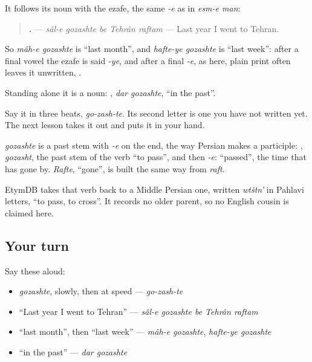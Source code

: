 It follows its noun with the ezafe, the same \emph{-e} as in \emph{esm-e man}:

\begin{quote}
\textbf{    .} — \emph{sâl-e gozashte be Tehrân raftam} — Last year I went to Tehran.
\end{quote}

So \emph{mâh-e gozashte} is \textquotedblleft{}last month\textquotedblright{}, and \emph{hafte-ye gozashte} is \textquotedblleft{}last week\textquotedblright{}: after a final vowel the ezafe is said \emph{-ye}, and after a final \emph{-e}, as here, plain print often leaves it unwritten, \textbf{ }.

Standing alone it is a noun: \textbf{ }, \emph{dar gozashte}, \textquotedblleft{}in the past\textquotedblright{}.

Say it in three beats, \emph{go-zash-te}. Its second letter is one you have not written yet. The next lesson takes it out and puts it in your hand.

\begin{cousinweb}
\emph{gozashte} is a past stem with \emph{-e} on the end, the way Persian makes a participle: \textbf{}, \emph{gozasht}, the past stem of the verb \textquotedblleft{}to pass\textquotedblright{}, and then \emph{-e}: \textquotedblleft{}passed\textquotedblright{}, the time that has gone by. \emph{Rafte}, \textquotedblleft{}gone\textquotedblright{}, is built the same way from \emph{raft}.

EtymDB takes that verb back to a Middle Persian one, written \emph{wtštn'} in Pahlavi letters, \textquotedblleft{}to pass, to cross\textquotedblright{}. It records no older parent, so no English cousin is claimed here.
\end{cousinweb}

\subsection*{Your turn}
Say these aloud:

\begin{itemize}
\raggedright
  \item \emph{gozashte}, slowly, then at speed — \emph{go-zash-te}
  \item \textquotedblleft{}Last year I went to Tehran\textquotedblright{} — \emph{sâl-e gozashte be Tehrân raftam}
  \item \textquotedblleft{}last month\textquotedblright{}, then \textquotedblleft{}last week\textquotedblright{} — \emph{mâh-e gozashte}, \emph{hafte-ye gozashte}
  \item \textquotedblleft{}in the past\textquotedblright{} — \emph{dar gozashte}
\end{itemize}


